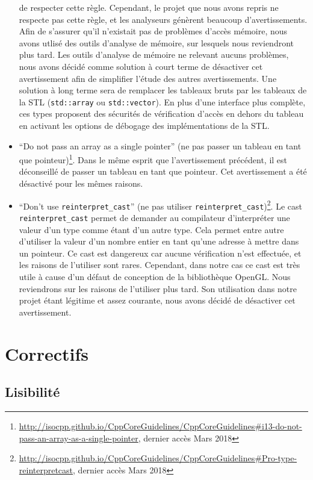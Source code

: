 \begin{itemize}
  de respecter cette règle. Cependant, le projet que nous avons repris
  ne respecte pas cette règle, et les analyseurs génèrent beaucoup
  d'avertissements. Afin de s'assurer qu'il n'existait pas de problèmes
  d'accès mémoire, nous avons utlisé des outils d'analyse de mémoire,
  sur lesquels nous reviendront plus tard. Les outils d'analyse de
  mémoire ne relevant aucuns problèmes, nous avons décidé comme solution
  à court terme de désactiver cet avertissement afin de simplifier
  l'étude des autres avertissements. Une solution à long terme sera de
  remplacer les tableaux bruts par les tableaux de la STL
  (\texttt{std::array} ou \texttt{std::vector}). En plus d'une interface
  plus complète, ces types proposent des sécurités de vérification
  d'accès en dehors du tableau en activant les options de débogage des
  implémentations de la STL.
\item
  ``Do not pass an array as a single pointer'' (ne pas passer un tableau
  en tant que
  pointeur)\footnote{\url{http://isocpp.github.io/CppCoreGuidelines/CppCoreGuidelines\#i13-do-not-pass-an-array-as-a-single-pointer}, dernier accès Mars 2018}. Dans le même esprit que
  l'avertissement précédent, il est déconseillé de passer un tableau en
  tant que pointeur. Cet avertissement a été désactivé pour les mêmes
  raisons.
\item
  ``Don't use \texttt{reinterpret\_cast}'' (ne pas utiliser
  \texttt{reinterpret\_cast})\footnote{\url{http://isocpp.github.io/CppCoreGuidelines/CppCoreGuidelines\#Pro-type-reinterpretcast}, dernier accès Mars 2018}. Le cast
  \texttt{reinterpret\_cast} permet de demander au compilateur
  d'interpréter une valeur d'un type comme étant d'un autre type. Cela
  permet entre autre d'utiliser la valeur d'un nombre entier en tant
  qu'une adresse à mettre dans un pointeur. Ce cast est dangereux car
  aucune vérification n'est effectuée, et les raisons de l'utiliser sont
  rares. Cependant, dans notre cas ce cast est très utile à cause d'un
  défaut de conception de la bibliothèque OpenGL. Nous reviendrons sur
  les raisons de l'utiliser plus tard. Son utilisation dans notre projet
  étant légitime et assez courante, nous avons décidé de désactiver cet
  avertissement.
\end{itemize}

\section{Correctifs}

\subsection{Lisibilité}

